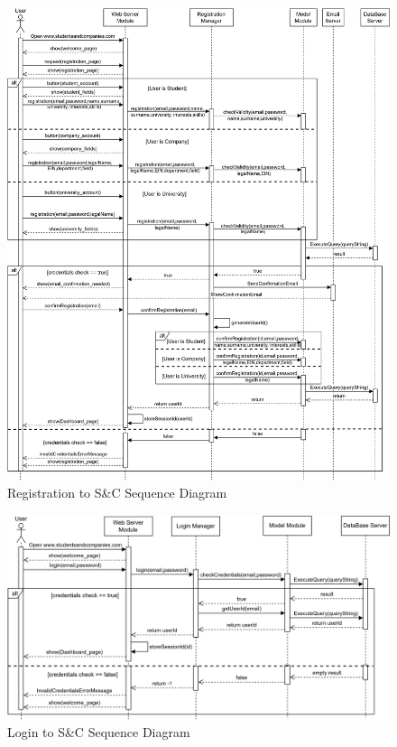 \begin{figure}[H]
    \centering
    \includegraphics[width=1\textwidth]{Images/Runtime_view/registration_SD.png}
    \caption{Registration to S\&C Sequence Diagram}
\end{figure}
\begin{figure}[H]
    \centering
    \includegraphics[width=1\textwidth]{Images/Runtime_view/login_SD.png}
    \caption{Login to S\&C Sequence Diagram}
\end{figure}
